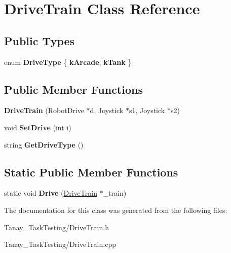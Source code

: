 \hypertarget{class_drive_train}{\section{Drive\-Train Class Reference}
\label{class_drive_train}
}
\subsection*{Public Types}
\begin{DoxyCompactItemize}
\item 
enum {\bfseries Drive\-Type} \{ {\bfseries k\-Arcade}, 
{\bfseries k\-Tank}
 \}
\end{DoxyCompactItemize}
\subsection*{Public Member Functions}
\begin{DoxyCompactItemize}
\item 
\hypertarget{class_drive_train_a4af3d04dea11ea9b22b14ea4b8782f62}{{\bfseries Drive\-Train} (Robot\-Drive $\ast$d, Joystick $\ast$s1, Joystick $\ast$s2)}\label{class_drive_train_a4af3d04dea11ea9b22b14ea4b8782f62}

\item 
\hypertarget{class_drive_train_a473ef742ec39b0adc74e4639e1c68a0b}{void {\bfseries Set\-Drive} (int i)}\label{class_drive_train_a473ef742ec39b0adc74e4639e1c68a0b}

\item 
\hypertarget{class_drive_train_a54f67e1d0215853d31c465db2e8c45c3}{string {\bfseries Get\-Drive\-Type} ()}\label{class_drive_train_a54f67e1d0215853d31c465db2e8c45c3}

\end{DoxyCompactItemize}
\subsection*{Static Public Member Functions}
\begin{DoxyCompactItemize}
\item 
\hypertarget{class_drive_train_a308435ed1b4ea0a0ce0c0f1748152695}{static void {\bfseries Drive} (\hyperlink{class_drive_train}{Drive\-Train} $\ast$\-\_\-train)}\label{class_drive_train_a308435ed1b4ea0a0ce0c0f1748152695}

\end{DoxyCompactItemize}


The documentation for this class was generated from the following files\-:\begin{DoxyCompactItemize}
\item 
Tanay\-\_\-\-Task\-Testing/Drive\-Train.\-h\item 
Tanay\-\_\-\-Task\-Testing/Drive\-Train.\-cpp\end{DoxyCompactItemize}
